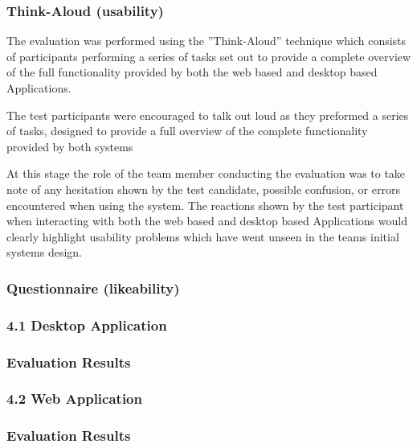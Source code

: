 \subsubsection{Think-Aloud (usability) }

The evaluation was performed using the ”Think-Aloud” technique  which consists of participants performing a series of tasks set out to provide a complete overview of the full functionality provided by both the web based and desktop based Applications. 

The test participants were encouraged to talk out loud as they preformed a series of tasks, designed to provide a full overview of the complete functionality provided by both systems 

At this stage the role of the team member conducting the evaluation was to take note of any hesitation shown by the test candidate, possible confusion, or errors encountered when using the system. The reactions shown by the test participant when interacting with both the web based and desktop based Applications would clearly highlight usability problems which have went unseen in the teams initial systems design. 


\subsubsection{Questionnaire (likeability)}

\subsubsection{4.1 Desktop Application}





\subsubsection{Evaluation Results}

\subsubsection{4.2 Web Application}

\subsubsection{Evaluation Results}
















































